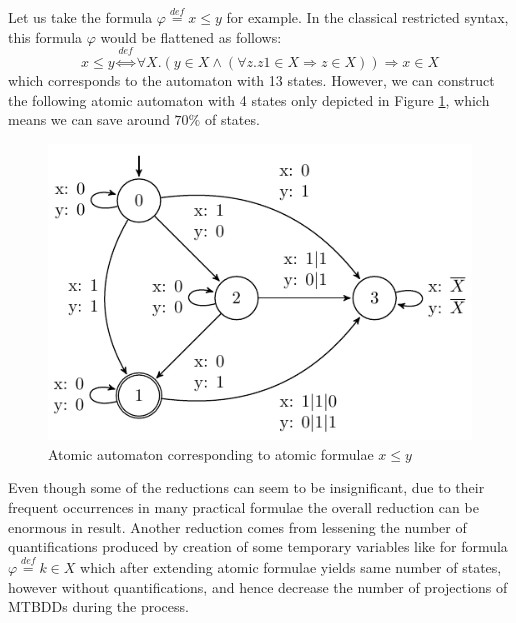  \noindent\hrulefill
 \begin{example}
 Let us take the formula $\varphi \overset{\mathit{def}}{=} x \leq y$ for
 example.
 In the classical restricted syntax, this formula $\varphi$ would be flattened as follows:
 \begin{equation}
  x \leq y \overset{\mathit{def}}{\Leftrightarrow} \forall X. (y \in X \wedge
  (\forall z.
  z1 \in X \Rightarrow z \in X)) \Rightarrow x \in X
 \end{equation} 
 which corresponds to the automaton with 13 states. However, we can construct
 the following atomic automaton with 4 states only depicted in Figure
 \ref{less-eq}, which means we can save around $70\%$ of states.
 \begin{figure}[h!]
 \begin{center}
  \includegraphics{fig/atomic-x-lesseq-y}
 \end{center}
 \caption{Atomic automaton corresponding to atomic formulae $x \leq
 y$}\label{less-eq}
\end{figure}
 \end{example}
 \noindent\hrulefill
\newpage
 Even though some of the reductions can seem to be
 insignificant, due to their frequent occurrences in many practical formulae the
 overall reduction can be enormous in result. Another reduction comes from
 lessening the number of quantifications produced by creation of some temporary
 variables like for formula $\varphi \overset{\mathit{def}}{=} k \in X$ which
 after extending atomic formulae yields same number of states, however without
 quantifications, and hence decrease the number of projections of MTBDDs during
 the process.
 
